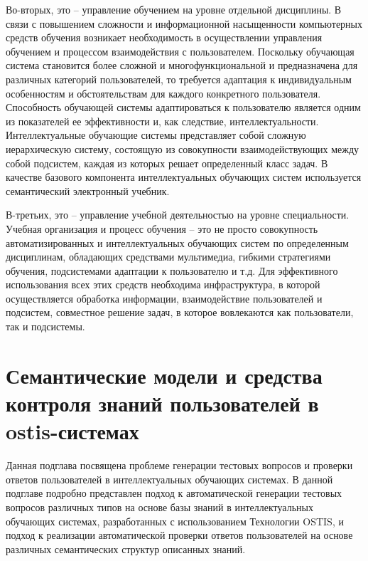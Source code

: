 Во-вторых, это -- управление обучением на уровне отдельной дисциплины. В связи с повышением сложности и информационной насыщенности компьютерных средств обучения возникает необходимость в осуществлении управления обучением и процессом взаимодействия с пользователем. Поскольку обучающая система становится более сложной и многофункциональной и предназначена для различных категорий пользователей, то требуется адаптация к индивидуальным особенностям и обстоятельствам для каждого конкретного пользователя. Способность обучающей системы адаптироваться к пользователю является одним из показателей ее эффективности и, как следствие, интеллектуальности. Интеллектуальные обучающие системы представляет собой сложную иерархическую систему, состоящую из совокупности взаимодействующих между собой подсистем, каждая из которых решает определенный класс задач. В качестве базового компонента интеллектуальных обучающих систем используется семантический электронный учебник.

В-третьих, это -- управление учебной деятельностью на уровне специальности. Учебная организация и процесс обучения -- это не просто совокупность автоматизированных и интеллектуальных обучающих систем по определенным дисциплинам, обладающих средствами мультимедиа, гибкими стратегиями обучения, подсистемами адаптации к пользователю и т.д. Для эффективного использования всех этих средств необходима инфраструктура, в которой осуществляется обработка информации, взаимодействие пользователей и подсистем, совместное решение задач, в которое вовлекаются как пользователи, так и подсистемы.

\section{Семантические модели и средства контроля знаний пользователей в ostis-системах}
\label{section_semantic_model_and_knowledge_control}

Данная подглава посвящена проблеме генерации тестовых вопросов и проверки ответов пользователей в интеллектуальных обучающих системах. В данной подглаве подробно представлен подход к автоматической генерации тестовых вопросов различных типов на основе базы знаний в интеллектуальных обучающих системах, разработанных с использованием Технологии OSTIS, и подход к реализации автоматической проверки ответов пользователей на основе различных семантических структур описанных знаний.



